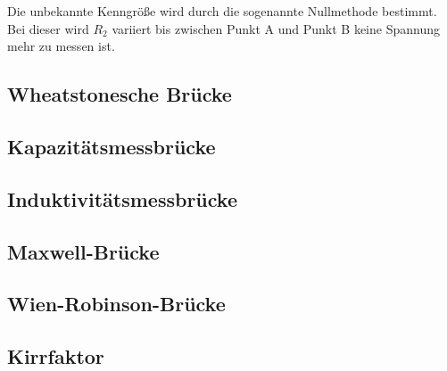     Die unbekannte Kenngröße wird durch die sogenannte Nullmethode bestimmt. Bei dieser wird $R_2$ variiert bis zwischen Punkt A und Punkt B keine Spannung mehr zu
    messen ist. 
    \subsection{Wheatstonesche Brücke}
    \subsection{Kapazitätsmessbrücke}
    \subsection{Induktivitätsmessbrücke}
    \subsection{Maxwell-Brücke}
    \subsection{Wien-Robinson-Brücke}
    \subsection{Kirrfaktor}



